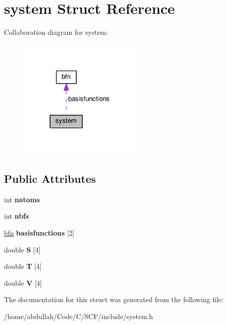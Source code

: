 \hypertarget{structsystem}{}\section{system Struct Reference}
\label{structsystem}


Collaboration diagram for system\+:\nopagebreak
\begin{figure}[H]
\begin{center}
\leavevmode
\includegraphics[width=172pt]{structsystem__coll__graph}
\end{center}
\end{figure}
\subsection*{Public Attributes}
\begin{DoxyCompactItemize}
\item 
\mbox{\label{structsystem_a050b734bee365115e01985c92259c341}} 
int {\bfseries natoms}
\item 
\mbox{\label{structsystem_af0ef0fc69a0d7507a30b34ad85423107}} 
int {\bfseries nbfs}
\item 
\mbox{\label{structsystem_a3f67573d943d74c49af44e5b58831cc3}} 
\hyperlink{structbfn}{bfn} {\bfseries basisfunctions} \mbox{[}2\mbox{]}
\item 
\mbox{\label{structsystem_a09bdd0e4409f90f1bc717c885d4c73ae}} 
double {\bfseries S} \mbox{[}4\mbox{]}
\item 
\mbox{\label{structsystem_a5a6a6bc69c5ea5f4766eadfc9bb6d9a0}} 
double {\bfseries T} \mbox{[}4\mbox{]}
\item 
\mbox{\label{structsystem_aab96dec27f74570c47ba777703c75bce}} 
double {\bfseries V} \mbox{[}4\mbox{]}
\end{DoxyCompactItemize}


The documentation for this struct was generated from the following file\+:\begin{DoxyCompactItemize}
\item 
/home/abdullah/\+Code/\+C/\+S\+C\+F/include/system.\+h\end{DoxyCompactItemize}
